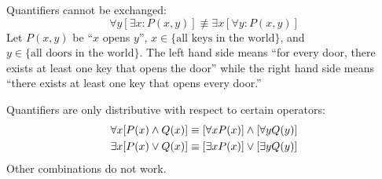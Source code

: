 \begin{remark}
    Quantifiers cannot be exchanged:
    $$
    \forall y [\exists x : P(x,y)] \nequiv \exists x [\forall y : P(x, y)]
    $$
    Let $P(x,y)$ be ``$x$ opens $y$'', $x\in\{\text{all keys in the world}\}$, and
    $y\in\{\text{all doors in the world}\}$. The left hand side means ``for every door, there exists
    at least one key that opens the door'' while the right hand side means ``there exists
    at least one key that opens every door.''
\end{remark}

\begin{remark}
    Quantifiers are only distributive with respect to certain operators:
    \begin{align*}
        \forall x [P(x) \wedge Q(x)] &\equiv [\forall x P(x)] \wedge [\forall y Q(y)] \\
        \exists x [P(x) \vee Q(x)] &\equiv [\exists x P(x)] \vee [\exists y Q(y)]
    \end{align*}
    Other combinations do not work.
\end{remark}